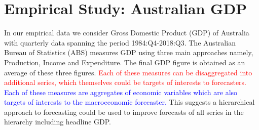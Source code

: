 \documentclass[graybox]{svmult}
\begin{document}


\section{Empirical Study: Australian GDP}\label{sec:data}

In our empirical data we consider Gross Domestic Product (GDP) of Australia with quarterly data spanning the period 1984:Q4-2018:Q3. The Australian Bureau of Statistics (ABS) measures GDP using three main approaches namely, Production, Income and Expenditure. The final GDP figure is obtained as an average of these three figures. \textcolor{red}{Each of these measures can be disaggregated into additional series, which themselves could be targets of interests to forecasters.} \textcolor{blue}{Each of these measures are aggregates of economic variables which are also targets of interests to the macroeconomic forecaster.} This suggests a hierarchical approach to forecasting could be used to improve forecasts of all series in the hierarchy including headline GDP.
\end{document}
